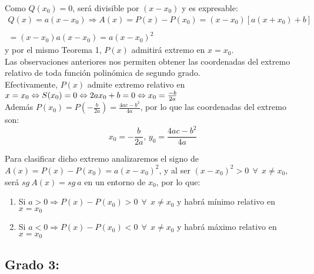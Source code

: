 \documentclass[12pt]{article}
\begin{document}
Como $Q({x}_0)=0$, será divisible por $(x-{x}_0)$ y es expresable:
$$
  \begin{array}{lll}
    Q(x)=a(x-{x}_0)
    \Rightarrow
    A(x)=P(x)-P({x}_0)=(x-{x}_0)[a(x+{x}_0)+b] \\
    \\
    =(x-{x}_0)a(x-{x}_0)=a(x-{x}_0)^2
  \end{array}
$$
y por el mismo Teorema 1, $P(x)$ admitirá extremo en $x={x}_0$. \\
Las observaciones anteriores nos permiten obtener las coordenadas del extremo relativo de toda función polinómica de segundo grado. \\
Efectivamente, $P(x)$ admite extremo relativo en $x={x}_0 \Leftrightarrow S({x}_0)=0 \\ \Leftrightarrow 2a{x}_0+b=0 \Leftrightarrow x_0=\frac{-b}{2a}$ \\
Además $P({x}_0)=P(-\frac{b}{2a})=\frac{4ac-b^2}{4a}$, por lo que las coordenadas del extremo son:
$$
  {x}_0=-\frac{b}{2a}\text{, \ }{y}_0=\frac{4ac-b^2}{4a}
$$

Para clasificar dicho extremo analizaremos el signo de $A(x)=P(x)-P({x}_0)=a(x-{x}_0)^2$, y al ser $(x-{x}_0)^2 > 0 \ \ \forall \ \ x \neq {x}_0$, será $sg \ A(x)=sg \ a$ en un entorno de ${x}_0$, por lo que:

\begin{enumerate}
  \item Si $a>0 \Rightarrow P(x)-P({x}_0)>0 \ \ \forall \ \ x\neq {x}_0$ y habrá mínimo relativo en $x={x}_0$

  \item Si $a<0 \Rightarrow P(x)-P({x}_0)<0 \ \ \forall \ \ x\neq {x}_0$ y habrá máximo relativo en $x={x}_0$
\end{enumerate}
\text{ \\ }

\subsection*{Grado 3:}
\end{document}
